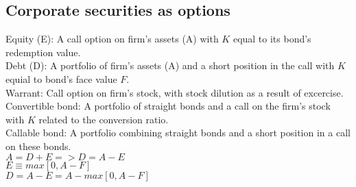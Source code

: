 \subsection*{Corporate securities as options}
Equity (E): A call option on firm's assets (A) with $K$ equal to its bond's redemption value.\\
Debt (D): A portfolio of firm's assets (A) and a short position in the call with $K$ equial to bond's face value $F$.\\
Warrant: Call option on firm's stock, with stock dilution as a result of excercise.\\
Convertible bond: A portfolio of straight bonds and a call on the firm's stock with $K$ related to the conversion ratio.\\
Callable bond: A portfolio combining straight bonds and a short position in a call on these bonds.\\
$A = D + E => D = A - E$\\
$E \equiv max[0, A - F]$\\
$D = A- E = A - max[0, A -F]$
